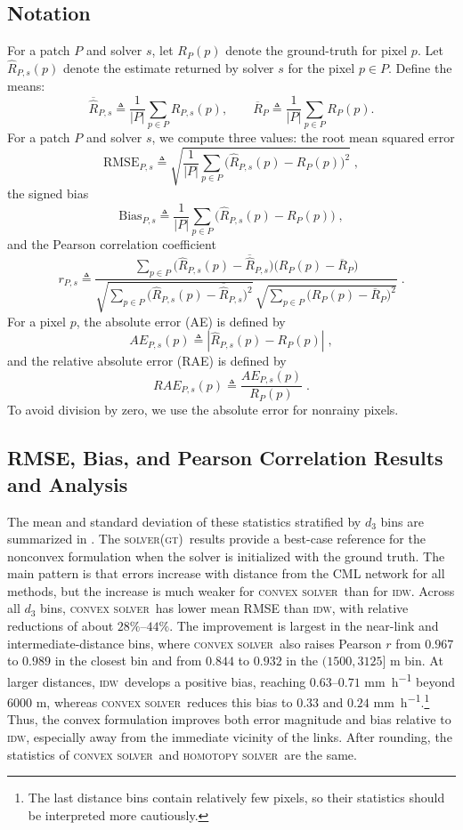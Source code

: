 \documentclass[a4paper,fleqn]{cas-sc}
\DeclareRobustCommand{\IDW}{\textsc{idw}}
\DeclareRobustCommand{\solverGT}{\textsc{solver(gt)}}
\DeclareRobustCommand{\solverConvex}{\textsc{convex solver}}
\DeclareRobustCommand{\solverHomotopy}{\textsc{homotopy solver}}
\DeclareRobustCommand{\ConvexSolver}{\solverConvex}
\DeclareRobustCommand{\Homotopy}{\solverHomotopy}
\begin{document}
\subsection{Notation}
For a patch $P$ and solver $s$, let
$R_P(p)$ denote the ground-truth for pixel $p$.
Let $\widehat{R}_{P,s}(p)$ denote the estimate returned by solver $s$ for the pixel $p\in P$.
Define the means:
\[
  \overline{\widehat{R}}_{P,s}\triangleq \frac{1}{|P|}\sum_{p\in P}\widehat{R}_{P,s}(p),
  \qquad
  \overline{R}_P\triangleq \frac{1}{|P|}\sum_{p\in P}R_P(p).
\]
For a patch $P$ and solver $s$, we  compute three values: the root mean squared error
\[
  \mathrm{RMSE}_{P,s}\triangleq
  \sqrt{\frac{1}{|P|}\sum_{p\in P}\bigl(\widehat{R}_{P,s}(p)-R_P(p)\bigr)^2}\;,
\]
the signed bias
\[
  \mathrm{Bias}_{P,s}\triangleq
  \frac{1}{|P|}\sum_{p\in P}\bigl(\widehat{R}_{P,s}(p)-R_P(p)\bigr)\;,
\]
and the Pearson correlation coefficient
\[
  r_{P,s}\triangleq
  \frac{\sum_{p\in P}\bigl(\widehat{R}_{P,s}(p)-\overline{\widehat{R}}_{P,s}\bigr)\bigl(R_P(p)-\overline{R}_P\bigr)}
  {\sqrt{\sum_{p\in P}\bigl(\widehat{R}_{P,s}(p)-\overline{\widehat{R}}_{P,s}\bigr)^2}\,
    \sqrt{\sum_{p\in P}\bigl(R_P(p)-\overline{R}_P\bigr)^2}}\;.
\]
For a pixel $p$, the absolute error (AE) is defined by
\[
  AE_{P,s}(p) \triangleq |\widehat{R}_{P,s}(p)-R_P(p)|\;,
\]
and the relative absolute error (RAE) is defined by
\[
  RAE_{P,s}(p) \triangleq \frac{AE_{P,s}(p)}{R_P(p)}\;.
\]
To avoid division by zero, we use the absolute error for nonrainy pixels.
\subsection{RMSE, Bias, and Pearson Correlation Results and Analysis}


The mean and standard deviation of these statistics stratified by $d_3$ bins are summarized in .
The \solverGT\ results provide a best-case reference for the nonconvex formulation when the solver is initialized with the ground truth.
%
The main pattern is that errors increase with distance from the CML network for all methods, but the increase is much weaker for \ConvexSolver\ than for \IDW. Across all $d_3$ bins, \ConvexSolver\ has lower mean RMSE than \IDW, with relative reductions of about $28\%$--$44\%$. The improvement is largest in the near-link and intermediate-distance bins, where \ConvexSolver\ also raises Pearson $r$ from $0.967$ to $0.989$ in the closest bin and from $0.844$ to $0.932$ in the $(1500,3125]$ m bin. At larger distances, \IDW\ develops a positive bias, reaching $0.63$--$0.71$ \si{\milli\meter\per\hour} beyond $6000$ m, whereas \ConvexSolver\ reduces this bias to $0.33$ and $0.24$ \si{\milli\meter\per\hour}.\footnote{The last distance bins contain relatively few pixels, so their statistics should be interpreted more cautiously.} Thus, the convex formulation improves both error magnitude and bias relative to \IDW, especially away from the immediate vicinity of the links.
After rounding, the statistics of \ConvexSolver\ and \Homotopy\ are the same.
\end{document}
